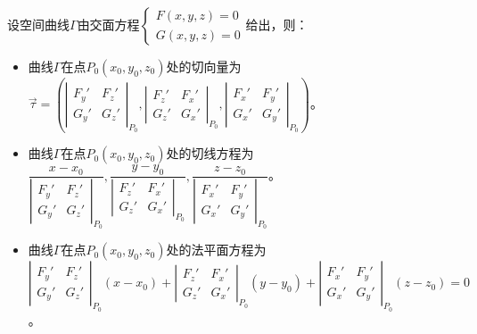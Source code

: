 \documentclass[UTF8, 12pt]{ctexart}
\begin{document}
设空间曲线$\varGamma$由交面方程$\left\{\begin{array}{l}
    F(x,y,z)=0 \\
    G(x,y,z)=0
\end{array}\right.$给出，则：

\begin{itemize}
    \item 曲线$\varGamma$在点$P_0(x_0,y_0,z_0)$处的切向量为\\$\vec{\tau}=\left(\left\vert\begin{array}{cc}
        F_y' & F_z' \\
        G_y' & G_z'
    \end{array}\right\vert_{P_0},\left\vert\begin{array}{ll}
        F_z' & F_x' \\
        G_z' & G_x'
    \end{array}\right\vert_{P_0},\left\vert\begin{array}{ll}
        F_x' & F_y' \\
        G_x' & G_y'
    \end{array}\right\vert_{P_0}\right)$。
    \item 曲线$\varGamma$在点$P_0(x_0,y_0,z_0)$处的切线方程为\\$\dfrac{x-x_0}{\left\vert\begin{array}{cc}
        F_y' & F_z' \\
        G_y' & G_z'
    \end{array}\right\vert_{P_0}},\dfrac{y-y_0}{\left\vert\begin{array}{ll}
        F_z' & F_x' \\
        G_z' & G_x'
    \end{array}\right\vert_{P_0}},\dfrac{z-z_0}{\left\vert\begin{array}{ll}
        F_x' & F_y' \\
        G_x' & G_y'
    \end{array}\right\vert_{P_0}}$。
    \item 曲线$\varGamma$在点$P_0(x_0,y_0,z_0)$处的法平面方程为\\$\left\vert\begin{array}{cc}
        F_y' & F_z' \\
        G_y' & G_z'
    \end{array}\right\vert_{P_0}(x-x_0)+\left\vert\begin{array}{ll}
        F_z' & F_x' \\
        G_z' & G_x'
    \end{array}\right\vert_{P_0}(y-y_0)+\left\vert\begin{array}{ll}
        F_x' & F_y' \\
        G_x' & G_y'
    \end{array}\right\vert_{P_0}(z-z_0)=0$。
\end{itemize}
\end{document}
